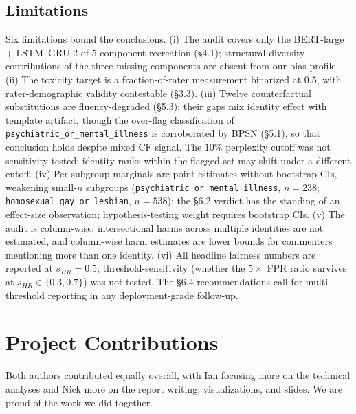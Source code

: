 \documentclass[11pt]{article}
\begin{document}
\subsection{Limitations}

Six limitations bound the conclusions. (i) The audit covers only the BERT-large + LSTM--GRU 2-of-5-component recreation (\S4.1); structural-diversity contributions of the three missing components are absent from our bias profile. (ii) The toxicity target is a fraction-of-rater measurement binarized at $0.5$, with rater-demographic validity contestable (\S3.3). (iii) Twelve counterfactual substitutions are fluency-degraded (\S5.3); their gaps mix identity effect with template artifact, though the over-flag classification of \texttt{psychiatric\_or\_mental\_illness} is corroborated by BPSN (\S5.1), so that conclusion holds despite mixed CF signal. The $10\%$ perplexity cutoff was not sensitivity-tested; identity ranks within the flagged set may shift under a different cutoff. (iv) Per-subgroup marginals are point estimates without bootstrap CIs, weakening small-$n$ subgroups (\texttt{psychiatric\_or\_mental\_illness}, $n=238$; \texttt{homosexual\_gay\_or\_lesbian}, $n=538$); the \S6.2 verdict has the standing of an effect-size observation; hypothesis-testing weight requires bootstrap CIs. (v) The audit is column-wise; intersectional harms across multiple identities are not estimated, and column-wise harm estimates are lower bounds for commenters mentioning more than one identity. (vi) All headline fairness numbers are reported at $s_{HR} = 0.5$; threshold-sensitivity (whether the $5\times$ FPR ratio survives at $s_{HR} \in \{0.3, 0.7\}$) was not tested. The \S6.4 recommendations call for multi-threshold reporting in any deployment-grade follow-up.

\section{Project Contributions}

Both authors contributed equally overall, with Ian focusing more on the technical analyses and Nick more on the report writing, visualizations, and slides. We are proud of the work we did together.

{\small

}
\end{document}
